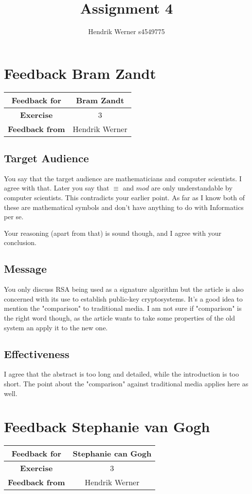 \documentclass[12pt, a4paper]{article}
\title{Assignment 4}
\author{Hendrik Werner s4549775}
\begin{document}
\maketitle

\clearpage
\section{Feedback Bram Zandt}
\begin{tabular}{|c|c|}
	\hline
	\textbf{Feedback for} & Bram Zandt\\\hline
	\textbf{Exercise} & 3\\\hline
	\textbf{Feedback from} & Hendrik Werner\\\hline
\end{tabular}

\subsection{Target Audience}
You say that the target audience are mathematicians and computer scientists. I agree with that. Later you say that $\equiv$ and $mod$ are only understandable by computer scientists. This contradicts your earlier point. As far as I know both of these are mathematical symbols and don't have anything to do with Informatics per se.

Your reasoning (apart from that) is sound though, and I agree with your conclusion.

\subsection{Message}
You only discuss RSA being used as a signature algorithm but the article is also concerned with its use to establish public-key cryptosystems. It's a good idea to mention the "comparison" to traditional media. I am not sure if "comparison" is the right word though, as the article wants to take some properties of the old system an apply it to the new one.

\subsection{Effectiveness}
I agree that the abstract is too long and detailed, while the introduction is too short. The point about the "comparison" against traditional media applies here as well.

\clearpage
\section{Feedback Stephanie van Gogh}
\begin{tabular}{|c|c|}
	\hline
	\textbf{Feedback for} & Stephanie can Gogh\\\hline
	\textbf{Exercise} & 3\\\hline
	\textbf{Feedback from} & Hendrik Werner\\\hline
\end{tabular}
\end{document}
